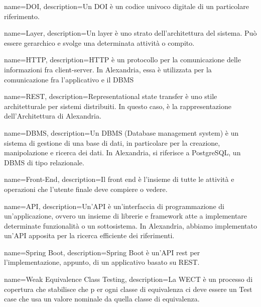 {
    name={DOI},
    description={Un DOI è un codice univoco digitale di un particolare riferimento.}
}

{
    name={Layer},
    description={Un layer è uno strato dell'architettura del sistema. Può essere gerarchico e svolge una determinata attività o compito.}
}

{
    name={HTTP},
    description={HTTP è un protocollo per la comunicazione delle informazioni fra client-server. In Alexandria, essa è utilizzata per la comunicazione fra l'applicativo e il DBMS}
}

{
    name={REST},
    description={Representational state transfer è uno stile architetturale per sistemi distribuiti. In questo caso, è la rappresentazione dell'Architettura di Alexandria.}
}

{
    name={DBMS},
    description={Un DBMS (Database management system) è un sistema di gestione di una base di dati, in particolare per la creazione, manipolazione e ricerca dei dati. In Alexandria, si riferisce a PostgreSQL, un DBMS di tipo relazionale.}
}


{
    name={Front-End},
    description={Il front end è l'insieme di tutte le attività e operazioni che l'utente finale deve compiere o vedere.}
}

{
    name={API},
    description={Un'API è un'interfaccia di programmazione di un'applicazione, ovvero un insieme di librerie e framework atte a implementare determinate funzionalità o un sottosistema. In Alexandria, abbiamo implementato un'API apposita per la ricerca efficiente dei riferimenti.}
}

{
    name={Spring Boot},
    description={Spring Boot è un'API rest per l'implementazione, appunto, di un applicativo basato su REST.}
}

{
    name={Weak Equivalence Class Testing},
    description={La WECT è un processo di copertura che stabilisce che p er ogni classe di equivalenza
ci deve essere un Test case che usa un valore nominale da quella classe
di equivalenza.}
}

\printglossaries

